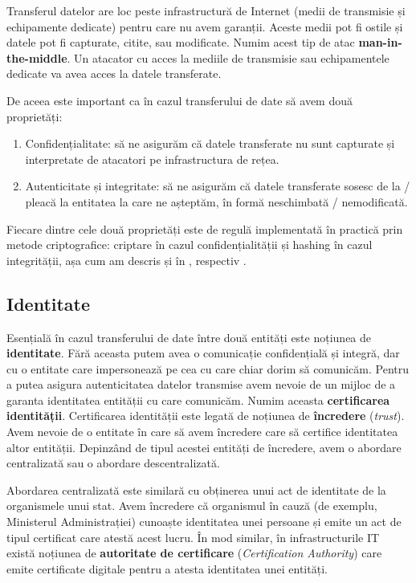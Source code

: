 Transferul datelor are loc peste infrastructură de Internet (medii de transmisie și echipamente dedicate) pentru care nu avem garanții. Aceste medii pot fi ostile și datele pot fi capturate, citite, sau modificate. Numim acest tip de atac \textbf{man-in-the-middle}. Un atacator cu acces la mediile de transmisie sau echipamentele dedicate va avea acces la datele transferate.

De aceea este important ca în cazul transferului de date să avem două proprietăți:

\begin{enumerate}
  \item Confidențialitate: să ne asigurăm că datele transferate nu sunt capturate și interpretate de atacatori pe infrastructura de rețea.
  \item Autenticitate și integritate: să ne asigurăm că datele transferate sosesc de la / pleacă la entitatea la care ne așteptăm, în formă neschimbată / nemodificată.
\end{enumerate}

Fiecare dintre cele două proprietăți este de regulă implementată în practică prin metode criptografice: criptare în cazul confidențialității și hashing în cazul integrității, așa cum am descris și în , respectiv .

\subsection{Identitate}
\label{sec:sec:transfer:identity}

Esențială în cazul transferului de date între două entități este noțiunea de \textbf{identitate}. Fără aceasta putem avea o comunicație confidențială și integră, dar cu o entitate care impersonează pe cea cu care chiar dorim să comunicăm. Pentru a putea asigura autenticitatea datelor transmise avem nevoie de un mijloc de a garanta identitatea entității cu care comunicăm. Numim aceasta \textbf{certificarea identității}. Certificarea identității este legată de noțiunea de \textbf{încredere} (\textit{trust}). Avem nevoie de o entitate în care să avem încredere care să certifice identitatea altor entității. Depinzând de tipul acestei entități de încredere, avem o abordare centralizată sau o abordare descentralizată.

Abordarea centralizată este similară cu obținerea unui act de identitate de la organismele unui stat. Avem încredere că organismul în cauză (de exemplu, Ministerul Administrației) cunoaște identitatea unei persoane și emite un act de tipul certificat care atestă acest lucru. În mod similar, în infrastructurile IT există noțiunea de \textbf{autoritate de certificare} (\textit{Certification Authority}) care emite certificate digitale pentru a atesta identitatea unei entități.

